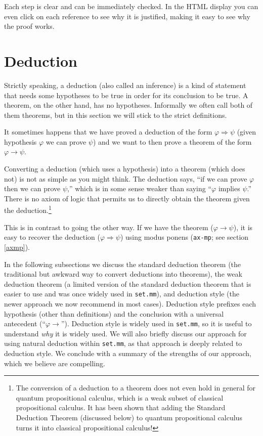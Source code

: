 Each step is clear and can be immediately checked.
In the HTML display you can even click on each reference to see why it is
justified, making it easy to see why the proof works.

\section{Deduction}\label{deduction}

Strictly speaking,
a deduction (also called an inference) is a kind of statement that needs
some hypotheses to be true in order for its conclusion to be true.
A theorem, on the other hand, has no hypotheses.
Informally we often call both of them theorems, but in this section we
will stick to the strict definitions.

It sometimes happens that we have proved a deduction of the form
$\varphi \Rightarrow \psi$
(given hypothesis $\varphi$ we can prove $\psi$)
and we want to then prove a theorem of the form
$\varphi \rightarrow \psi$.

Converting a deduction (which uses a hypothesis) into a theorem
(which does not) is not as simple as you might think.
The deduction says, ``if we can prove $\varphi$ then we can prove $\psi$,''
which is in some sense weaker than saying
``$\varphi$ implies $\psi$.''
There is no axiom of logic that permits us to directly obtain the theorem
given the deduction.\footnote{
The conversion of a deduction to a theorem does not even hold in general
for quantum propositional calculus,
which is a weak subset of classical propositional calculus.
It has been shown that adding the Standard Deduction Theorem (discussed below)
to quantum propositional calculus turns it into classical
propositional calculus!
}

This is in contrast to going the other way.
If we have the theorem ($\varphi \rightarrow \psi$),
it is easy to recover the deduction
($\varphi \Rightarrow \psi$)
using modus ponens
(\texttt{ax-mp}; see section \ref{axmp}).

In the following subsections we discuss the standard deduction theorem
(the traditional but awkward way to convert deductions into theorems),
the weak deduction theorem (a limited version of the standard deduction
theorem that is easier to use and was once widely used in
\texttt{set.mm}),
and deduction style (the newer approach we now recommend in most cases).
Deduction style prefixes each hypothesis (other than definitions) and the
conclusion with a universal antecedent (``$\varphi \rightarrow$'').
Deduction style is widely used in \texttt{set.mm},
so it is useful to understand \textit{why} it is widely used.
We will also briefly discuss our approach for using natural deduction
within \texttt{set.mm}, as that approach is deeply related to deduction style.
We conclude with a summary of the strengths of
our approach, which we believe are compelling.

